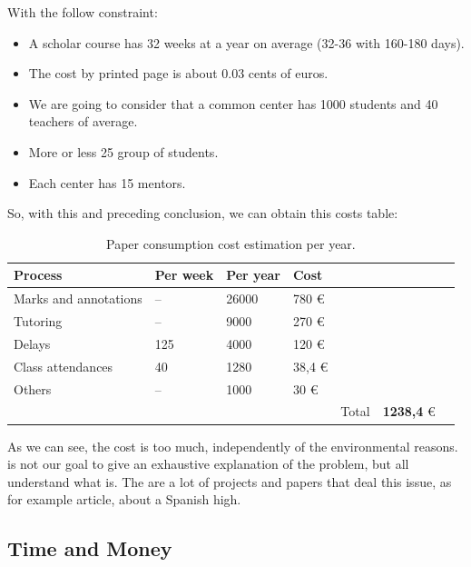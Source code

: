 With the follow constraint:

\begin{itemize}
  \setlength{\itemsep}{0pt}
\item A scholar course has 32 weeks at a year on average (32-36 with 160-180 days).
\item The cost by printed page is about 0.03 cents of euros.
\item We are going to consider that a common center has 1000 students and 40 teachers of average.
\item More or less 25 group of students.
\item Each center has 15 mentors.
\end{itemize}

So, with this and preceding conclusion, we can obtain this costs table:

\begin{table}[H]
\centering

\begin{tabular}{@{}lllllll@{}}

Process & Per week  & Per year  & Cost  \\
\midrule

Marks and annotations   &  --  &  26000  &   780      \euro  \\
Tutoring              &  --  &  9000   &   270      \euro  \\
Delays                  &  125 &  4000   &   120      \euro  \\
Class attendances       &  40  &  1280   &   38,4     \euro  \\
Others                  &  --  &  1000   &   30       \euro  \\

\midrule
& & & & Total & \textbf{1238,4} \euro \\
\end{tabular}
\caption{Paper consumption cost estimation per year.}
\label{my-label}
\end{table}


\noindent As we can see, the cost is too much, independently of the environmental reasons.
is not our goal to give an exhaustive explanation of the problem, but all understand what is.
The are a lot of projects and papers that deal this issue, as for example \cite{paperconsumption}
article, about a Spanish high. \pagebreak

\subsection{Time and Money}

